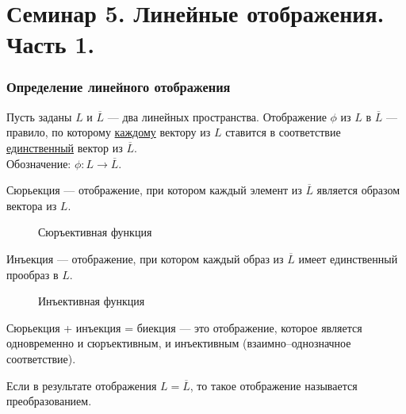 \part{Семинар 5. Линейные отображения. Часть 1.}
\section{Определение линейного отображения}
\begin{definition}
	Пусть заданы $L$ и $\overline{L}$ --- два линейных пространства. \textsf{Отображение} $\phi$ из $L$ в $\overline{L}$ --- правило, по которому \underline{каждому} вектору из $L$ ставится в соответствие \underline{единственный} вектор из $\overline{L}$.\\
	Обозначение: $\phi: L\rightarrow\overline{L}$.
\end{definition}

\begin{definition}
	\textsf{Сюрьекция} --- отображение, при котором каждый элемент из $\overline{L}$ является образом вектора из $L$.
\end{definition}

\begin{figure}[h!]
	\centering
	\def\svgwidth{5cm} %
	
	\caption{Сюръективная функция}
	\label{...}
\end{figure}

\begin{definition}
	\textsf{Инъекция} --- отображение, при котором каждый образ из $\overline{L}$ имеет единственный прообраз в $L$.
\end{definition}

\begin{figure}[h!]
	\centering
	\def\svgwidth{5cm} %
	
	\caption{Инъективная функция}
	\label{...}
\end{figure}

\begin{definition}
	Сюрьекция + инъекция = \textsf{биекция} --- это отображение, которое является одновременно и сюръективным, и инъективным (взаимно--однозначное соответствие).
\end{definition}

\begin{definition}
	Если в результате отображения $L=\overline{L}$, то такое отображение называется \textsf{преобразованием}.
\end{definition}

